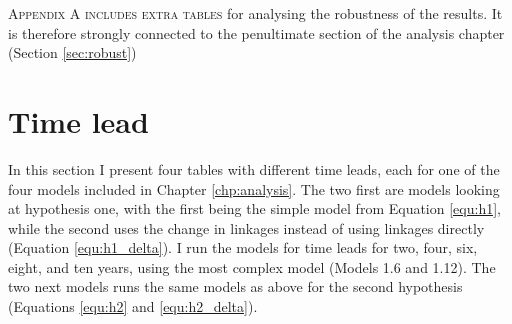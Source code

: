 \lettrine{A}{ppendix A includes extra tables} for analysing the robustness of the results. It is therefore strongly connected to the penultimate section of the analysis chapter (Section \ref{sec:robust})

\section{Time lead}
In this section I present four tables with different time leads, each for one of the four models included in Chapter \ref{chp:analysis}. The two first are models looking at hypothesis one, with the first being the simple model from Equation \ref{equ:h1}, while the second uses the change in linkages instead of using linkages directly (Equation \ref{equ:h1_delta}). I run the models for time leads for two, four, six, eight, and ten years, using the most complex model (Models 1.6 and 1.12). The two next models runs the same models as above for the second hypothesis (Equations \ref{equ:h2} and \ref{equ:h2_delta}). 

